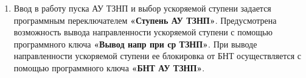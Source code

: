 \begin{enumerate}
\begin{enumerate}
\item
Ввод в работу пуска АУ ТЗНП и выбор ускоряемой ступени задается программным переключателем
\textbf{«Ступень АУ ТЗНП»}. Предусмотрена возможность вывода направленности ускоряемой ступени с помощью
программного ключа \textbf{«Вывод напр при ср ТЗНП»}. При выводе направленности ускоряемой ступени ее
блокировка от БНТ осуществляется с помощью программного ключа \textbf{«БНТ АУ ТЗНП»}.

\end{enumerate}

\end{enumerate}